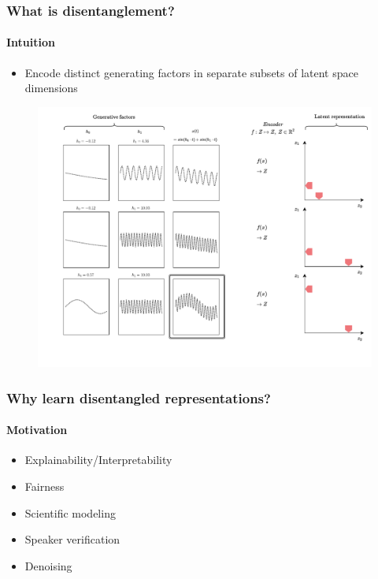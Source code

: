 \documentclass[9pt]{beamer}
\begin{document}
\begin{frame}
\frametitle{What is disentanglement?}
\framesubtitle{Intuition}
\begin{itemize}%
	\item Encode distinct generating factors in separate subsets of latent space dimensions
\end{itemize}
\begin{figure}
	\includegraphics[width=.93\linewidth]{figures/intution_3x3_3.pdf}
\end{figure}
\end{frame} 





\begin{frame}
\frametitle{Why learn disentangled representations?}
\framesubtitle{Motivation}
\begin{itemize}%
	\item Explainability/Interpretability
	\item Fairness
	\item Scientific modeling %
	\item Speaker verification %
	\item Denoising
\end{itemize}
\end{frame} 
\end{document}
